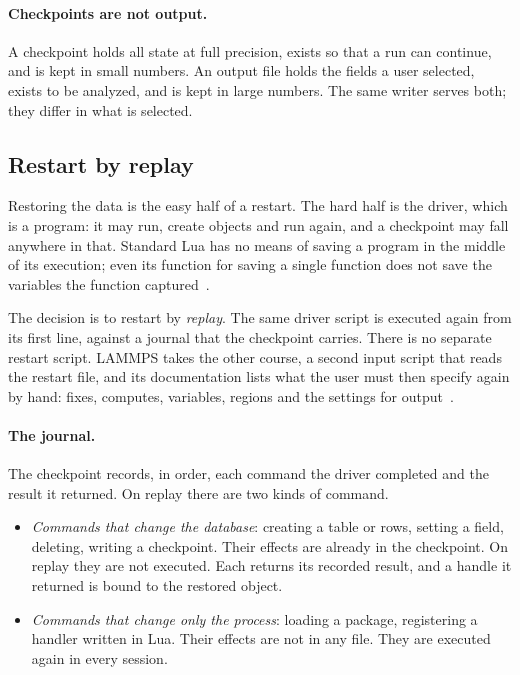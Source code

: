 \documentclass[11pt,a4paper]{article}
\begin{document}
\paragraph{Checkpoints are not output.}  A checkpoint holds all state at
full precision, exists so that a run can continue, and is kept in small
numbers.  An output file holds the fields a user selected, exists to be
analyzed, and is kept in large numbers.  The same writer serves both; they
differ in what is selected.

\subsection{Restart by replay}
\label{sec:replay}

Restoring the data is the easy half of a restart.  The hard half is the
driver, which is a program: it may run, create objects and run again, and a
checkpoint may fall anywhere in that.  Standard Lua has no means of saving
a program in the middle of its execution; even its function for saving a
single function does not save the variables the function
captured~\cite{lua55}.

The decision is to restart by \emph{replay}.  The same driver script is
executed again from its first line, against a journal that the checkpoint
carries.  There is no separate restart script.  LAMMPS takes the other
course, a second input script that reads the restart file, and its
documentation lists what the user must then specify again by hand: fixes,
computes, variables, regions and the settings for
output~\cite{lammpsrestart}.

\paragraph{The journal.}  The checkpoint records, in order, each command
the driver completed and the result it returned.  On replay there are two
kinds of command.

\begin{itemize}
  \item \emph{Commands that change the database}: creating a table or rows,
        setting a field, deleting, writing a checkpoint.  Their effects are
        already in the checkpoint.  On replay they are not executed.  Each
        returns its recorded result, and a handle it returned is bound to
        the restored object.
  \item \emph{Commands that change only the process}: loading a package,
        registering a handler written in Lua.  Their effects are not in any
        file.  They are executed again in every session.
\end{itemize}
\end{document}
